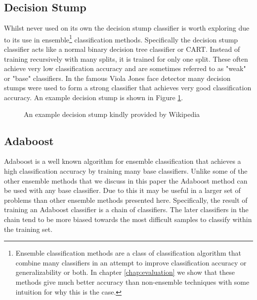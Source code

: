 \documentclass[ %
                    author={Sam Phippen},
                supervisor={Dr. Rafal Bogacz},
                     title={Real time voice activity detectors in noisy personal computing environments},
                  subtitle={},
                    degree={MEng},
                      year={2012} ]{thesis}
\begin{document}
\subsection{Decision Stump}

Whilst never used on its own the decision stump classifier is worth exploring
due to its use in ensemble\footnote{Ensemble classification methods are a class
    of classification algorithm that combine many classifiers in an attempt to
    improve classification accuracy or generalizability or both. In chapter
\ref{chap:evaluation} we show that these methods give much better accuracy than
non-ensemble techniques with some intuition for why this is the case.}
classification methods. Specifically the decision stump classifier acts like a
normal binary decision tree classifier or CART. Instead of training recursively
with many splits, it is trained for only one split. These often achieve very
low classification accuracy and are sometimes referred to as "weak" or "base"
classifiers. In the famous Viola Jones face detector\cite{viola} many decision
stumps were used to form a strong classifier that achieves very good
classification accuracy. An example decision stump is shown in Figure
\ref{fig:decision-stump}.

\begin{figure}



    \label{fig:decision-stump}
    \caption{An example decision stump kindly provided by Wikipedia}
\end{figure}

\subsection{Adaboost}

Adaboost is a well known algorithm for ensemble classification that achieves a
high classification accuracy by training many base classifiers. Unlike some of
the other ensemble methods that we discuss in this paper the Adaboost method
can be used with any base classifier. Due to this it may be useful in a larger
set of problems than other ensemble methods presented here. Specifically, the
result of training an Adaboost classifier is a chain of classifiers. The later
classifiers in the chain tend to be more biased towards the most difficult
samples to classify within the training set.
\end{document}

